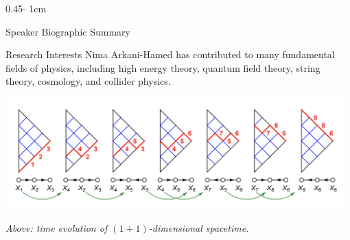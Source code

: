 \documentclass{../psuposter}
\begin{document}
\begin{frame}
\begin{columns}[onlytextwidth]
\begin{column}{0.45\textwidth - 1cm}
\begin{block}{Speaker Biographic Summary}
    \end{block}
%
%
%

    \begin{block}{Research Interests}
        Nima Arkani-Hamed has contributed to many fundamental fields of physics, including high energy theory, quantum field theory, string theory, cosmology, and collider physics.
        \begin{center}
	    	\includegraphics[width=0.98\textwidth]{images/quiver-nolabel}    		
    	\end{center}
    	\textit{Above: time evolution of $(1+1)$-dimensional spacetime}. \cite{arkani-hamedCausalDiamondsCluster2020}
    \end{block}
\end{column}



\end{columns}
\end{frame}
\end{document}
